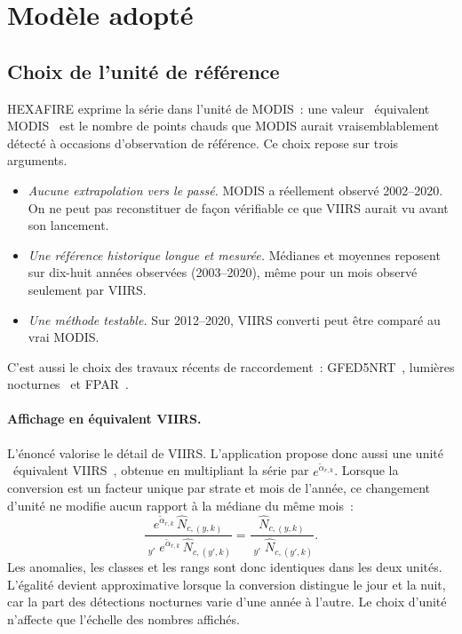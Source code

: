 \documentclass[11pt,a4paper]{article}
\newcommand{\og}{\guillemotleft~}
\newcommand{\fg}{~\guillemotright}
\DeclareMathOperator{\med}{m\acute{e}d}
\begin{document}
\section{Modèle adopté}\label{sec:modele}

\subsection{Choix de l'unité de référence}\label{sec:reference}

HEXAFIRE exprime la série dans l'unité de MODIS~: une valeur \og équivalent MODIS\fg{} est le nombre de points chauds que MODIS aurait vraisemblablement détecté à occasions d'observation de référence. Ce choix repose sur trois arguments.
\begin{itemize}
  \item \emph{Aucune extrapolation vers le passé.} MODIS a réellement observé 2002--2020. On ne peut pas reconstituer de façon vérifiable ce que VIIRS aurait vu avant son lancement.
  \item \emph{Une référence historique longue et mesurée.} Médianes et moyennes reposent sur dix-huit années observées (2003--2020), même pour un mois observé seulement par VIIRS.
  \item \emph{Une méthode testable.} Sur 2012--2020, VIIRS converti peut être comparé au vrai MODIS.
\end{itemize}
C'est aussi le choix des travaux récents de raccordement~: GFED5NRT~\cite{chen2026}, lumières nocturnes~\cite{li2020} et FPAR~\cite{seguini2026}.

\paragraph{Affichage en équivalent VIIRS.} L'énoncé valorise le détail de VIIRS. L'application propose donc aussi une unité \og équivalent VIIRS\fg, obtenue en multipliant la série par $e^{\tilde\alpha_{r,k}}$. Lorsque la conversion est un facteur unique par strate et mois de l'année, ce changement d'unité ne modifie aucun rapport à la médiane du même mois~:
\begin{equation}
  \frac{e^{\tilde\alpha_{r,k}}\,\hat N_{c,(y,k)}}{\med_{y'} e^{\tilde\alpha_{r,k}}\,\hat N_{c,(y',k)}} = \frac{\hat N_{c,(y,k)}}{\med_{y'} \hat N_{c,(y',k)}}.
\end{equation}
Les anomalies, les classes et les rangs sont donc identiques dans les deux unités. L'égalité devient approximative lorsque la conversion distingue le jour et la nuit, car la part des détections nocturnes varie d'une année à l'autre. Le choix d'unité n'affecte que l'échelle des nombres affichés.
\end{document}
